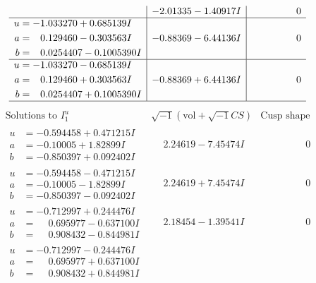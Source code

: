 \documentclass[1p]{elsarticle_modified}
\theoremstyle{definition}
\newcommand{\I}{\sqrt{-1}}
\begin{document}
$$\begin{array}{c|c|c}
 & -2.01335 - 1.40917 I & \phantom{-0.000000 } 0 \\ \hline\begin{aligned}
u &= -1.033270 + 0.685139 I \\
a &= \phantom{-}0.129460 - 0.303563 I \\
b &= \phantom{-}0.0254407 - 0.1005390 I\end{aligned}
 & -0.88369 - 6.44136 I & \phantom{-0.000000 } 0 \\ \hline\begin{aligned}
u &= -1.033270 - 0.685139 I \\
a &= \phantom{-}0.129460 + 0.303563 I \\
b &= \phantom{-}0.0254407 + 0.1005390 I\end{aligned}
 & -0.88369 + 6.44136 I & \phantom{-0.000000 } 0\\
 \hline 
 \end{array}$$\newpage$$\begin{array}{c|c|c}  
\text{Solutions to }I^u_{1}& \I (\text{vol} + \sqrt{-1}CS) & \text{Cusp shape}\\
 \hline 
\begin{aligned}
u &= -0.594458 + 0.471215 I \\
a &= -0.10005 + 1.82899 I \\
b &= -0.850397 + 0.092402 I\end{aligned}
 & \phantom{-}2.24619 - 7.45474 I & \phantom{-0.000000 } 0 \\ \hline\begin{aligned}
u &= -0.594458 - 0.471215 I \\
a &= -0.10005 - 1.82899 I \\
b &= -0.850397 - 0.092402 I\end{aligned}
 & \phantom{-}2.24619 + 7.45474 I & \phantom{-0.000000 } 0 \\ \hline\begin{aligned}
u &= -0.712997 + 0.244476 I \\
a &= \phantom{-}0.695977 - 0.637100 I \\
b &= \phantom{-}0.908432 - 0.844981 I\end{aligned}
 & \phantom{-}2.18454 - 1.39541 I & \phantom{-0.000000 } 0 \\ \hline\begin{aligned}
u &= -0.712997 - 0.244476 I \\
a &= \phantom{-}0.695977 + 0.637100 I \\
b &= \phantom{-}0.908432 + 0.844981 I\end{aligned}

\end{array}$$
\end{document}
